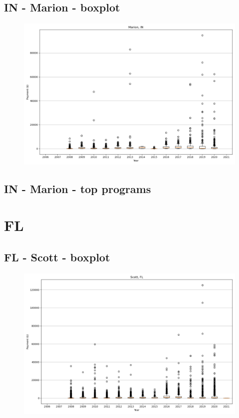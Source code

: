 \subsection*{IN - Marion - boxplot}
\begin{figure}[h]
\centering
\includegraphics[width=7in]{../output/boxplots/counties/Marion-IN_boxplot.png}
\end{figure}


\subsection*{IN - Marion - top programs}

\newpage
\section*{FL}
\subsection*{FL - Scott - boxplot}
\begin{figure}[h]
\centering
\includegraphics[width=7in]{../output/boxplots/counties/Scott-FL_boxplot.png}
\end{figure}


